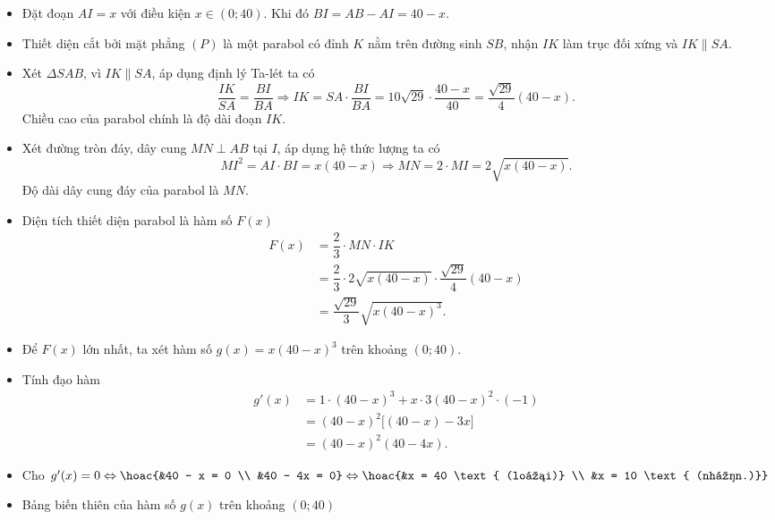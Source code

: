 \begin{ex}
{{}
		\begin{itemize}
			\item Đặt đoạn $AI = x$ với điều kiện $x \in (0; 40)$. Khi đó $BI = AB - AI = 40 - x$.
			\item Thiết diện cắt bởi mặt phẳng $(P)$ là một parabol có đỉnh $K$ nằm trên đường sinh $SB$, nhận $IK$ làm trục đối xứng và $IK \parallel SA$.
			\item Xét $\Delta SAB$, vì $IK \parallel SA$, áp dụng định lý Ta-lét ta có
			\[ \dfrac{IK}{SA} = \dfrac{BI}{BA} \Rightarrow IK = SA \cdot \dfrac{BI}{BA} = 10\sqrt{29} \cdot \dfrac{40 - x}{40} = \dfrac{\sqrt{29}}{4}(40 - x).\]
			Chiều cao của parabol chính là độ dài đoạn $IK$.
			\item Xét đường tròn đáy, dây cung $MN \perp AB$ tại $I$, áp dụng hệ thức lượng ta có
			\[ MI^2 = AI \cdot BI = x(40 - x) \Rightarrow MN = 2 \cdot MI = 2\sqrt{x(40 - x)}.\]
			Độ dài dây cung đáy của parabol là $MN$.
			\item Diện tích thiết diện parabol là hàm số $F(x)$
			\begin{align*}
				F(x) &= \dfrac{2}{3} \cdot MN \cdot IK \\
				&= \dfrac{2}{3} \cdot 2\sqrt{x(40 - x)} \cdot \dfrac{\sqrt{29}}{4}(40 - x) \\
				&= \dfrac{\sqrt{29}}{3} \sqrt{x(40 - x)^3}.
			\end{align*}
			\item Để $F(x)$ lớn nhất, ta xét hàm số $g(x) = x(40 - x)^3$ trên khoảng $(0; 40)$.
			\item Tính đạo hàm
			\begin{align*}
				g'(x) &= 1 \cdot (40 - x)^3 + x \cdot 3(40 - x)^2 \cdot (-1) \\
				&= (40 - x)^2 \big[ (40 - x) - 3x \big] \\
				&= (40 - x)^2 (40 - 4x).
			\end{align*}
			\item Cho $g'(x) = 0 \Leftrightarrow \hoac{&40 - x = 0 \\ &40 - 4x = 0} \Leftrightarrow \hoac{&x = 40 \text{ (loại)} \\ &x = 10 \text{ (nhận.)}}$
			\item Bảng biến thiên của hàm số $g(x)$ trên khoảng $(0; 40)$

\end{itemize}}
\end{ex}
